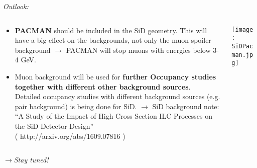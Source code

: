 \documentclass[xcolor={dvipsnames}]{beamer}
\begin{document}
\begin{frame}
\textit{Outlook:}
\begin{columns}
 \begin{column}{0.65\textwidth}
  \begin{itemize}
\item \textbf{PACMAN} should be included in the SiD geometry.
This will have a big effect on the backgrounds, not only the muon spoiler background $\rightarrow$ PACMAN will stop muons with energies below 3-4 GeV.
\item Muon background will be used for \textbf{further Occupancy studies together with different other background sources}.\\
\small Detailed occupancy studies with different background sources (e.g. pair background) is being done for SiD. $\rightarrow$ SiD background note: ``A Study of the Impact of High Cross Section ILC Processes on the SiD Detector Design''\\( http://arxiv.org/abs/1609.07816 )
\end{itemize}
 \end{column}
 \begin{column}{0.35\textwidth}
  \texttt{[image: SiDPacman.jpg]}
 \end{column}
\end{columns}
\vspace*{0.2cm}
\alert{
$\rightarrow$\textit{Stay tuned!}}
\end{frame}
\end{document}
